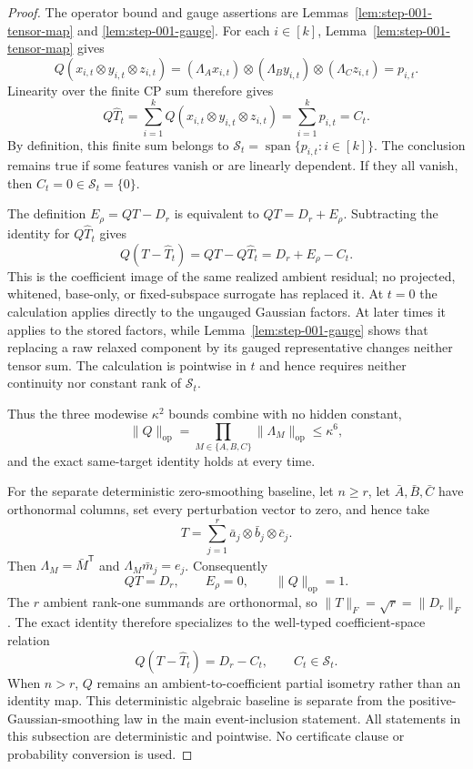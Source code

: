\begin{proof}
The operator bound and gauge assertions are
Lemmas~\ref{lem:step-001-tensor-map} and \ref{lem:step-001-gauge}.  For each
$i\in[k]$, Lemma~\ref{lem:step-001-tensor-map} gives
\[
Q(x_{i,t}\otimes y_{i,t}\otimes z_{i,t})
=(\Lambda_Ax_{i,t})\otimes(\Lambda_By_{i,t})
 \otimes(\Lambda_Cz_{i,t})
=p_{i,t}.
\]
Linearity over the finite CP sum therefore gives
\[
Q\widehat T_t
=\sum_{i=1}^kQ(x_{i,t}\otimes y_{i,t}\otimes z_{i,t})
=\sum_{i=1}^kp_{i,t}
=C_t.
\]
By definition, this finite sum belongs to
$\mathcal S_t=\operatorname{span}\{p_{i,t}:i\in[k]\}$.  The conclusion
remains true if some features vanish or are linearly dependent.  If they all
vanish, then $C_t=0\in\mathcal S_t=\{0\}$.

The definition $E_\rho=QT-D_r$ is equivalent to $QT=D_r+E_\rho$.
Subtracting the identity for $Q\widehat T_t$ gives
\[
Q(T-\widehat T_t)=QT-Q\widehat T_t=D_r+E_\rho-C_t.
\]
This is the coefficient image of the same realized ambient residual; no
projected, whitened, base-only, or fixed-subspace surrogate has replaced it.
At $t=0$ the calculation applies directly to the ungauged Gaussian factors.
At later times it applies to the stored factors, while
Lemma~\ref{lem:step-001-gauge} shows that replacing a raw relaxed component
by its gauged representative changes neither tensor sum.  The calculation is
pointwise in $t$ and hence requires neither continuity nor constant rank of
$\mathcal S_t$.

Thus the three modewise $\kappa^2$ bounds combine with no hidden constant,
\[
\|Q\|_{\mathrm{op}}
=\prod_{M\in\{A,B,C\}}\|\Lambda_M\|_{\mathrm{op}}
\leq\kappa^6,
\]
and the exact same-target identity holds at every time.

For the separate deterministic zero-smoothing baseline, let $n\geq r$, let
$\bar A,\bar B,\bar C$ have orthonormal columns, set every perturbation vector
to zero, and hence take
\[
T=\sum_{j=1}^r\bar a_j\otimes\bar b_j\otimes\bar c_j.
\]
Then $\Lambda_M=\bar M^{\mathsf T}$ and
$\Lambda_M\bar m_j=e_j$.  Consequently
\[
QT=D_r,
\qquad E_\rho=0,
\qquad \|Q\|_{\mathrm{op}}=1.
\]
The $r$ ambient rank-one summands are orthonormal, so
$\|T\|_F=\sqrt r=\|D_r\|_F$.  The exact identity therefore specializes to
the well-typed coefficient-space relation
\[
Q(T-\widehat T_t)=D_r-C_t,
\qquad C_t\in\mathcal S_t.
\]
When $n>r$, $Q$ remains an ambient-to-coefficient partial isometry rather
than an identity map.  This deterministic algebraic baseline is separate from
the positive-Gaussian-smoothing law in the main event-inclusion statement.
All statements in this subsection are deterministic and pointwise.  No
certificate clause or probability conversion is used.
\end{proof}

